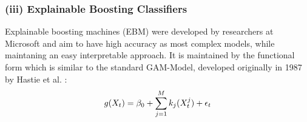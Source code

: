 \documentclass[12pt,titlepage]{article}
\begin{document}
\subsubsection*{(iii) Explainable Boosting Classifiers}

Explainable boosting machines (EBM) were developed by researchers at Microsoft \cite{interpretml} and aim to have high accuracy as most complex models, while maintaning an easy interpretable approach. It is maintained by the functional form which is similar to the standard GAM-Model, developed originally in 1987 by Hastie et al. \cite{gam}: \\

\begin{equation} \label{gam}
    g(X_{t}) = \beta_{0} + \sum_{j=1}^{M} k_{j}(X^{j}_{t}) + \epsilon_{t} \\
\end{equation}
\end{document}
